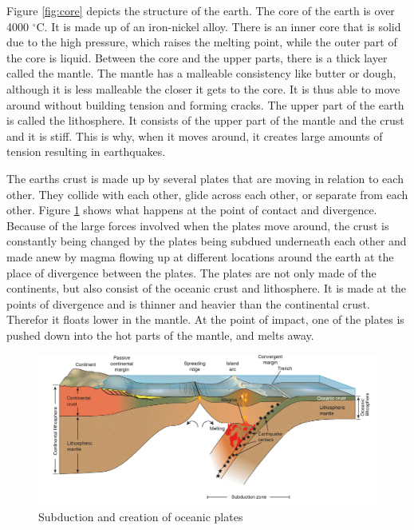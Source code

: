 \documentclass[a4paper,12pt]{report}
\begin{document}
Figure \ref{fig:core} depicts the structure of the earth. The core of the earth is over 4000 $^\circ$C. It is made up of an iron-nickel alloy. There is an inner core that is solid due to the high pressure, which raises the melting point, while the outer part of the core is liquid. Between the core and the upper parts, there is a thick layer called the mantle. The mantle has a malleable consistency like butter or dough, although it is less malleable the closer it gets to the core. It is thus able to move around without building tension and forming cracks. The upper part of the earth is called the lithosphere. It consists of the upper part of the mantle and the crust and it is stiff. This is why, when it moves around, it creates large amounts of tension resulting in earthquakes.

The earths crust is made up by several plates that are moving in relation to each other. They collide with each other, glide across each other, or separate from each other. Figure \ref{fig:fig99subduction} shows what happens at the point of contact and divergence.  Because of the large forces involved when the plates move around, the crust is constantly being changed by the plates being subdued underneath each other and made anew by magma flowing up at different locations around the earth at the place of divergence between the plates. The plates are not only made of the continents, but also consist of the oceanic crust and lithosphere. It is made at the points of divergence and is thinner and heavier than the continental crust. Therefor it floats lower in the mantle. At the point of impact, one of the plates is pushed down into the hot parts of the mantle, and melts away.

\begin{figure}
 \includegraphics[width=\linewidth]{thesis/geo/english/subduksjon.jpg}
 \caption{Subduction and creation of oceanic plates}
 \label{fig:fig99subduction}
\end{figure}
\end{document}
